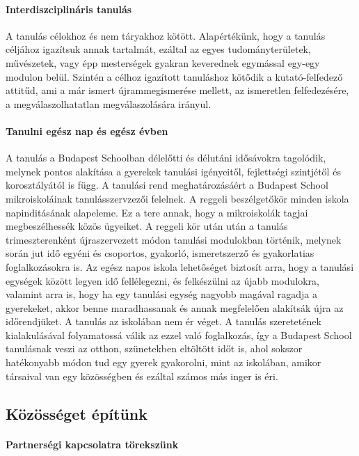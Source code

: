 \paragraph{Interdiszciplináris tanulás}

A tanulás célokhoz és nem táryakhoz kötött. Alapértékünk, hogy a tanulás
céljához igazítsuk annak tartalmát, ezáltal az egyes tudományterületek,
művészetek, vagy épp mesterségek gyakran keverednek egymással egy-egy modulon
belül. Szintén a célhoz igazított tanuláshoz kötődik a kutató-felfedező
attitűd, ami a már ismert újrammegismerése mellett, az ismeretlen
felfedezésére,
a megválaszolhatatlan megválaszolására irányul.

\paragraph{Tanulni egész nap és egész évben}

A tanulás a Budapest Schoolban délelőtti és délutáni idősávokra tagolódik,
melynek pontos
alakítása a gyerekek tanulási igényeitől, fejlettségi szintjétől és
korosztályától is függ. A tanulási rend meghatározásáért a Budapest
School mikroiskoláinak tanulásszervzezői felelnek. A reggeli
beszélgetőkör minden iskola napinditásának alapeleme. Ez a tere annak,
hogy a mikroiskolák tagjai megbeszélhessék közös ügyeiket. A reggeli kör
után után a tanulás trimeszterenként újraszervezett módon tanulási
modulokban történik, melynek során jut idő egyéni és csoportos,
gyakorló, ismeretszerző és gyakorlatias foglalkozásokra is. Az egész
napos iskola lehetőséget biztosít arra, hogy a tanulási egységek között
legyen idő fellélegezni, és felkészülni az újabb modulokra, valamint
arra is, hogy ha egy tanulási egység nagyobb magával ragadja a
gyerekeket, akkor benne maradhassanak és annak megfelelően alakítsák
újra az időrendjüket. A tanulás az iskolában nem ér véget. A tanulás
szeretetének kialakulásával folyamatossá válik az ezzel való foglalkozás, így a
Budapest School tanulásnak veszi az otthon, szünetekben eltöltött időt is, ahol
sokszor hatékonyabb módon tud egy gyerek gyakorolni, mint az iskolában, amikor
társaival van egy közösségben és ezáltal számos más inger is éri.

\subsection{Közösséget építünk}
\label{sec:kozosseget_epitunk}
\paragraph{Partnerségi kapcsolatra törekszünk}

